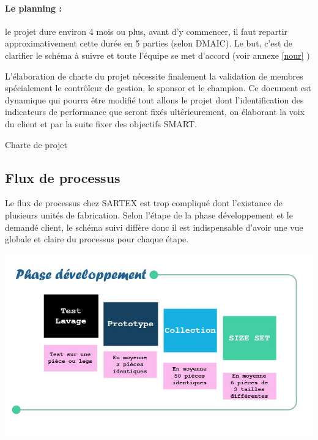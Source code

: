 \documentclass[12pt, a4paper]{thesis}
\begin{document}
\paragraph*{\textbf{Le planning} :} le projet dure environ 4 mois ou plus, avant d'y commencer, il faut repartir approximativement cette durée en 5 parties (selon DMAIC). Le but, c'est de clarifier le schéma à suivre et toute l'équipe se met d'accord (voir annexe \ref{nour}
)


L'élaboration de charte du projet nécessite finalement la validation de membres spécialement le contrôleur de gestion, le sponsor et le champion.
Ce document est dynamique qui pourra être modifié tout allons le projet dont l’identification des indicateurs de performance que seront fixés ultérieurement, on élaborant la voix du client et par la suite fixer des objectifs SMART.
\begin{center}

 \end{center}
\begin{table}[!htbp]
\begin{center}
\caption{Charte de projet}
 \end{center}
\end{table}
\subsection{Flux de processus}
Le flux de processus chez SARTEX est trop compliqué dont l'existance de plusieurs unités de fabrication.
Selon l'étape de la phase développement et le demandé client, le schéma suivi diffère donc il est indispensable d'avoir une vue globale et claire du processus pour chaque étape.
\begin{center}
        \includegraphics[scale=0.7]{phases.JPG}
\end{center}
\end{document}
